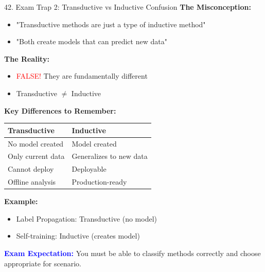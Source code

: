 \documentclass[8pt]{beamer}
\begin{document}
	\begin{frame}{42. Exam Trap 2: Transductive vs Inductive Confusion}
		\fontsize{6.5}{7.5}\selectfont
		\textbf{The Misconception:}
		\begin{itemize}
			\item "Transductive methods are just a type of inductive method"
			\item "Both create models that can predict new data"
		\end{itemize}
		
		\textbf{The Reality:}
		\begin{itemize}
			\item \textcolor{red}{FALSE!} They are fundamentally different
			\item Transductive $\neq$ Inductive
		\end{itemize}
		
		\textbf{Key Differences to Remember:}
		
		\begin{tabular}{|p{3.5cm}|p{3.5cm}|}
			\hline
			\textbf{Transductive} & \textbf{Inductive} \\
			\hline
			No model created & Model created \\
			\hline
			Only current data & Generalizes to new data \\
			\hline
			Cannot deploy & Deployable \\
			\hline
			Offline analysis & Production-ready \\
			\hline
		\end{tabular}
		
		\textbf{Example:}
		\begin{itemize}
			\item Label Propagation: Transductive (no model)
			\item Self-training: Inductive (creates model)
		\end{itemize}
		
		\textcolor{blue}{\textbf{Exam Expectation:}} You must be able to classify methods correctly and choose appropriate for scenario.
	\end{frame}
	
\end{document}
